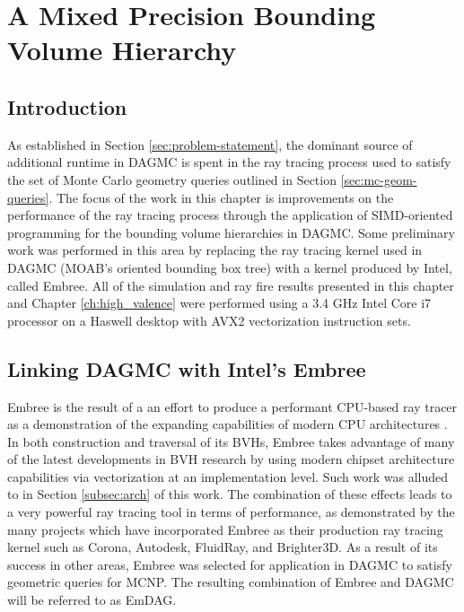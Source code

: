 
\chapter{A Mixed Precision Bounding Volume Hierarchy}\label{ch:simd_bvh}

\section{Introduction}

As established in Section \ref{sec:problem-statement}, the dominant source of
additional runtime in DAGMC is spent in the ray tracing process used to satisfy
the set of Monte Carlo geometry queries outlined in Section \ref{sec:mc-geom-queries}.
The focus of the work in this chapter is improvements on the performance of the
ray tracing process through the application of SIMD-oriented programming for the
bounding volume hierarchies in DAGMC. Some preliminary work was performed
in this area by replacing the ray tracing kernel used in DAGMC (MOAB's oriented
bounding box tree) with a kernel produced by Intel, called Embree. All of the
simulation and ray fire results presented in this chapter and Chapter
\ref{ch:high_valence} were performed using a 3.4 GHz Intel Core i7 processor on
a Haswell desktop with AVX2 vectorization instruction sets.

\section{Linking DAGMC with Intel's Embree}\label{sec:embree}

Embree is the result of a an effort to produce a performant CPU-based ray tracer
as a demonstration of the expanding capabilities of modern CPU architectures
\cite{Wald_2014}. In both construction and traversal of its BVHs, Embree takes
advantage of many of the latest developments in BVH research by using modern
chipset architecture capabilities via vectorization at an implementation level.
Such work was alluded to in Section \ref{subsec:arch} of this work. The
combination of these effects leads to a very powerful ray tracing tool in terms
of performance, as demonstrated by the many projects which have incorporated
Embree as their production ray tracing kernel such as Corona, Autodesk,
FluidRay, and Brighter3D. As a result of its success in other areas, Embree was
selected for application in DAGMC to satisfy geometric queries for MCNP. The
resulting combination of Embree and DAGMC will be referred to as EmDAG.

